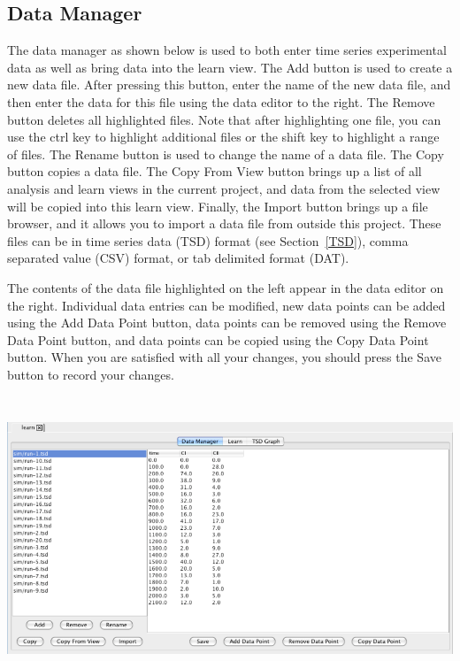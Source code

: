 \documentclass[titlepage,11pt]{article}
\begin{document}
\subsection{\label{dataManager}Data Manager}

\noindent
The data manager as shown below is used to both enter time series
experimental data as well as bring data
into the learn view.  The Add button is used to create a new data
file. After pressing this button, enter the name of the new data
file, and then enter the data for this file using the data editor
to the right.  The Remove button deletes all highlighted files.
Note that after highlighting one file, you can use the ctrl key
to highlight additional files or the shift key to highlight a
range of files.  The Rename button is used to change the name of a
data file. The Copy button copies a data file. The Copy From View
button brings up a list of all analysis and learn views in the
current project, and data from the selected view will be copied
into this learn view.  Finally, the Import button brings up a file
browser, and it allows you to import a data file from outside
this project.  These files can be in time series data (TSD) format
(see Section~\ref{TSD}), comma separated value (CSV) format, or tab
delimited format (DAT). 

The contents of the data file highlighted on the left appear in the
data editor on the right.  Individual data entries can be modified,
new data points can be added using the Add Data Point button, data 
points can be removed using the Remove Data Point button, and data
points can be copied using the Copy Data Point button.  When you are
satisfied with all your changes, you should press the Save button
to record your changes.
\begin{center}
\includegraphics[height=85mm]{screenshots/dataManager}
\end{center}
\end{document}
